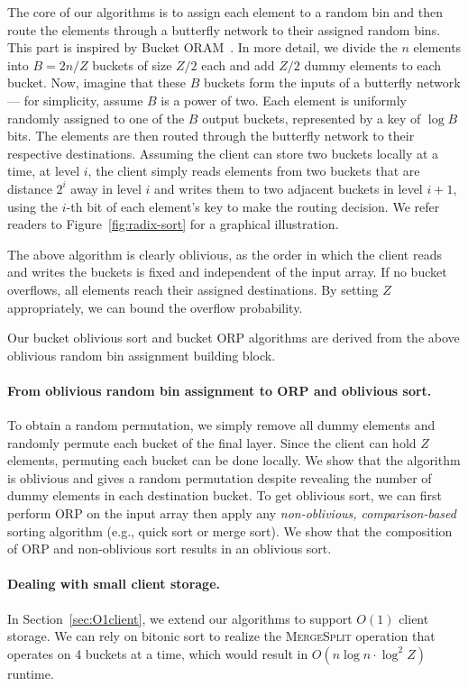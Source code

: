 The core of our algorithms is to assign each element to a random bin and then route the elements through a butterfly network to their assigned random bins. 
This part is inspired by Bucket ORAM~\cite{fletcher2015bucket}. 
In more detail, we divide the $n$ elements into $B=2n/Z$ buckets of size $Z/2$ each and add $Z/2$ dummy elements to each bucket.
Now, imagine that these $B$ buckets form the inputs of a butterfly network --- for simplicity, assume $B$ is a power of two.
Each element is uniformly randomly assigned to one of the $B$ output buckets, represented by a key of $\log B$ bits.
The elements are then routed through the butterfly network to their respective destinations.
Assuming the client can store two buckets locally at a time, at level $i$, the client simply reads elements from two buckets that are distance $2^i$ away in level $i$ and writes them to two adjacent buckets in level $i+1$, using the $i$-th bit of each element's key to make the routing decision. 
We refer readers to Figure~\ref{fig:radix-sort} for a graphical illustration.

The above algorithm is clearly oblivious, as the order in which the client reads and writes the buckets is fixed and independent of the input array. If no bucket overflows, all elements reach their assigned destinations. By setting $Z$ appropriately, we can bound the overflow probability.

Our bucket oblivious sort and bucket ORP algorithms are derived from
the above oblivious random bin assignment building block. 

\paragraph{From oblivious random bin assignment to ORP and oblivious sort.}
To obtain a random permutation, we simply remove all dummy elements and randomly permute 
each bucket of the final layer.
Since the client can hold $Z$ elements, permuting each bucket can be done locally. 
We show that the algorithm is oblivious and gives a random permutation despite revealing the number of dummy elements in each destination bucket.
To get oblivious sort, we can first perform ORP on the input array then apply any \emph{non-oblivious, comparison-based} sorting algorithm (e.g., quick sort or
merge sort). We show that the composition of ORP and non-oblivious sort results in an oblivious sort. 

\paragraph{Dealing with small client storage.}
In Section~\ref{sec:O1client}, we extend our algorithms to support $O(1)$ client storage. 
We can rely on bitonic sort to realize the \textsc{MergeSplit} operation that operates on 4 buckets at a time,
which would result in $O(n\log n\cdot \log^2 Z)$ runtime. 

